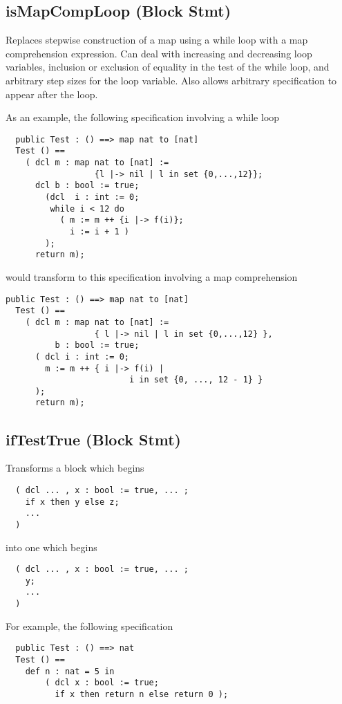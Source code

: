 \documentclass[\pformat,12pt]{article}
\begin{document}
\subsection{isMapCompLoop (Block Stmt)} 
  Replaces stepwise construction of a map using a while loop with a
  map comprehension expression. Can deal with increasing and
  decreasing loop variables, inclusion or exclusion of equality in the
  test of the while loop, and arbitrary step sizes for the loop
  variable. Also allows arbitrary specification to appear after the
  loop. 

As an example, the following specification involving a while loop

\begin{verbatim}
  public Test : () ==> map nat to [nat]
  Test () ==
    ( dcl m : map nat to [nat] := 
                  {l |-> nil | l in set {0,...,12}};
      dcl b : bool := true;
        (dcl  i : int := 0;
         while i < 12 do
           ( m := m ++ {i |-> f(i)};
             i := i + 1 )
        );
      return m);
\end{verbatim}

would transform to this specification involving a map comprehension

\begin{verbatim}
public Test : () ==> map nat to [nat]
  Test () ==
    ( dcl m : map nat to [nat] := 
                  { l |-> nil | l in set {0,...,12} },
          b : bool := true;
      ( dcl i : int := 0;
        m := m ++ { i |-> f(i) | 
                         i in set {0, ..., 12 - 1} }
      );
      return m);
\end{verbatim}


\subsection{ifTestTrue (Block Stmt)}
  Transforms a block which begins

\begin{verbatim}
  ( dcl ... , x : bool := true, ... ; 
    if x then y else z;
    ...
  )
\end{verbatim}

into one which begins

\begin{verbatim}
  ( dcl ... , x : bool := true, ... ; 
    y;
    ...
  )
\end{verbatim}

For example, the following specification

\begin{verbatim}
  public Test : () ==> nat  
  Test () ==
    def n : nat = 5 in
        ( dcl x : bool := true;
          if x then return n else return 0 );
\end{verbatim}
\end{document}
